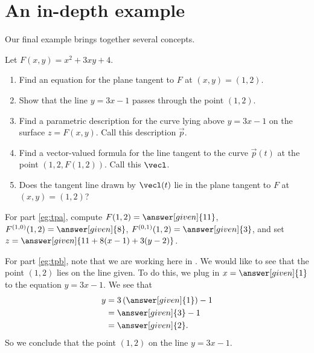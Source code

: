 \documentclass{ximera}
\begin{document}
\section{An in-depth example}

Our final example brings together several concepts.
\begin{example}
  Let $F(x,y) = x^2 + 3xy + 4$.
  \begin{enumerate}
  \item\label{eg:tpa} Find an equation for the plane tangent to $F$ at $(x,y) =
    (1,2)$.
  \item\label{eg:tpb} Show that the line $y = 3x - 1$ passes through the point $(1,2)$.
  \item\label{eg:tpc} Find a parametric description for the curve
    lying above $y = 3x-1$ on the surface $z = F(x,y)$. Call this
    description $\vec{p}$.
  \item\label{eg:tpd} Find a vector-valued formula for the line tangent to the curve
    $\vec{p}(t)$ at the point $(1, 2, F(1,2))$. Call this $\vecl$.
  \item\label{eg:tpe} Does the tangent line drawn by $\vecl(t)$ lie in the plane
    tangent to $F$ at $(x,y)=(1,2)$?
  \end{enumerate}
  \begin{explanation}
    For part \ref{eg:tpa}, compute $F(1,2) = \answer[given]{11}$,
    $F^{(1,0)}(1,2) = \answer[given]{8}$, $F^{(0,1)}(1,2) =
    \answer[given]{3}$, and set $z = \answer[given]{11 + 8(x-1) +
      3(y-2)}$.

    For part \ref{eg:tpb}, note that we are working here in
    .  We would like to see that the point
    $(1,2)$ lies on the line given.  To do this, we plug in $x =
    \answer[given]{1}$ to the equation $y = 3x - 1$.  We see that
          \begin{align*}
            y &= 3\left(\answer[given]{1}\right) - 1 \\
            &= \answer[given]{3} - 1 \\
            &= \answer[given]{2}.
          \end{align*}
          So we conclude that the point $(1, 2)$
           on the
          line $y = 3x-1$.
 

\end{explanation}
\end{example}
\end{document}
